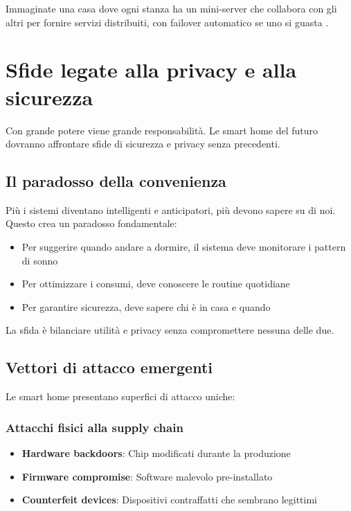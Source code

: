 Immaginate una casa dove ogni stanza ha un mini-server che collabora con gli altri per fornire servizi distribuiti, con failover automatico se uno si guasta \parencite{etsiWifi6}.

\section{Sfide legate alla privacy e alla sicurezza}

Con grande potere viene grande responsabilità. Le smart home del futuro dovranno affrontare sfide di sicurezza e privacy senza precedenti.

\subsection{Il paradosso della convenienza}

Più i sistemi diventano intelligenti e anticipatori, più devono sapere su di noi. Questo crea un paradosso fondamentale:

\begin{itemize}
    \item Per suggerire quando andare a dormire, il sistema deve monitorare i pattern di sonno
    \item Per ottimizzare i consumi, deve conoscere le routine quotidiane
    \item Per garantire sicurezza, deve sapere chi è in casa e quando
\end{itemize}

La sfida è bilanciare utilità e privacy senza compromettere nessuna delle due.

\subsection{Vettori di attacco emergenti}

Le smart home presentano superfici di attacco uniche:

\subsubsection{Attacchi fisici alla supply chain}

\begin{itemize}
    \item \textbf{Hardware backdoors}: Chip modificati durante la produzione
    \item \textbf{Firmware compromise}: Software malevolo pre-installato
    \item \textbf{Counterfeit devices}: Dispositivi contraffatti che sembrano legittimi
\end{itemize}

